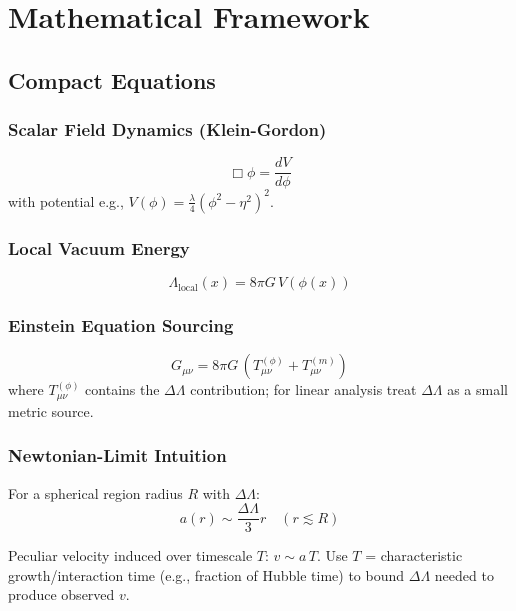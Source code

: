\documentclass[11pt,a4paper]{article}
\begin{document}
\section{Mathematical Framework}

\subsection{Compact Equations}

\subsubsection{Scalar Field Dynamics (Klein-Gordon)}
\begin{equation}
\Box\phi = \frac{dV}{d\phi}
\end{equation}
with potential e.g., $V(\phi)=\frac{\lambda}{4}(\phi^2-\eta^2)^2$.

\subsubsection{Local Vacuum Energy}
\begin{equation}
\Lambda_{\text{local}}(x)=8\pi G\,V(\phi(x))
\end{equation}

\subsubsection{Einstein Equation Sourcing}
\begin{equation}
G_{\mu\nu} = 8\pi G\,(T^{(\phi)}_{\mu\nu} + T^{(m)}_{\mu\nu})
\end{equation}
where $T^{(\phi)}_{\mu\nu}$ contains the $\Delta\Lambda$ contribution; for linear analysis treat $\Delta\Lambda$ as a small metric source.

\subsubsection{Newtonian-Limit Intuition}

For a spherical region radius $R$ with $\Delta\Lambda$:
\begin{equation}
a(r)\sim\frac{\Delta\Lambda}{3} r\quad (r\lesssim R)
\end{equation}

Peculiar velocity induced over timescale $T$: $v \sim a\,T$. Use $T$ = characteristic growth/interaction time (e.g., fraction of Hubble time) to bound $\Delta\Lambda$ needed to produce observed $v$.
\end{document}
